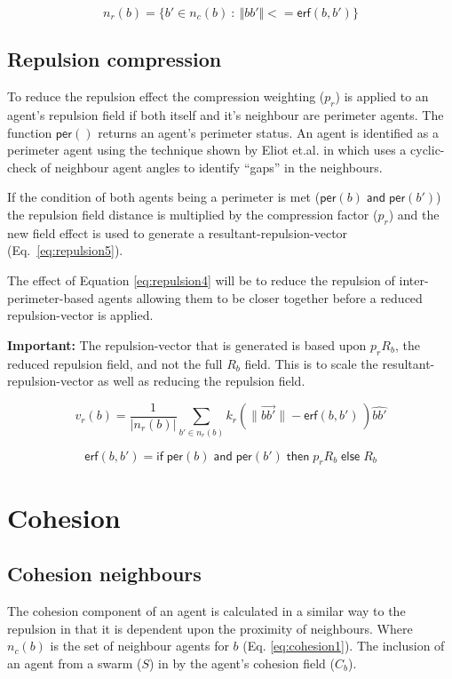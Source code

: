 \documentclass[12pt,a4paper]{article}
\newcommand{\important}[1]{\begin{importantBox} \textbf{Important:} #1 \end{importantBox}}
\newcommand{\magn}[1]{\Vert{#1}\Vert}
\begin{document}
\begin{equation}\label{eq:repulsion3}
n_r(b) = \{b' \in n_c(b)~:~\magn{bb'} <= \mathsf{erf}(b,b')\}
\end{equation}

\subsection{Repulsion compression}\label{repulsion:compression}
To reduce the repulsion effect the compression weighting ($p_r$) is applied to an agent's repulsion field if both itself and it's neighbour are perimeter agents. The function $\mathsf{per}()$ returns an agent's perimeter status. An agent is identified as a perimeter agent using the technique shown by Eliot et.al. in \cite{eliot2019void} which uses a cyclic-check of neighbour agent angles to identify ``gaps'' in the neighbours.

If the condition of both agents being a perimeter is met ($\mathsf{per}(b) \; \mathsf{and} \; \mathsf{per}(b')$) the repulsion field distance is multiplied by the compression factor ($p_r$) and the new field effect is used to generate a resultant-repulsion-vector (Eq.~\ref{eq:repulsion5}). 

The effect of Equation \ref{eq:repulsion4} will be to reduce the repulsion of inter-perimeter-based agents allowing them to be closer together before a reduced repulsion-vector is applied. 

\important{The repulsion-vector that is generated is based upon $p_rR_b$, the reduced repulsion field, and not the full $R_b$ field. This is to scale the resultant-repulsion-vector as well as reducing the repulsion field.}

\begin{equation}\label{eq:repulsion4}
v_r(b) = \frac{1}{\lvert n_r(b)\rvert}\sum_{b' \in n_r(b)} k_r\left(\lVert\vec{b b'}\rVert - \mathsf{erf}(b,b') \, \right)\widehat{bb'}
\end{equation}

\begin{equation}\label{eq:repulsion5}
\mathsf{erf}(b, b') = \mathsf{if} \;
\mathsf{per}(b) \; \mathsf{and} \; \mathsf{per}(b') \; \mathsf{then} \;
p_rR_b \; \mathsf{else} \; R_b
\end{equation}

\section{Cohesion}\label{cohesion}
\subsection{Cohesion neighbours}\label{cohesion:neighbours}
The cohesion component of an agent is calculated in a similar way to the repulsion in that it is dependent upon the proximity of neighbours. Where $n_c(b)$ is the set of neighbour agents for $b$ (Eq. \ref{eq:cohesion1}). The inclusion of an agent from a swarm ($S$) in by the agent's cohesion field ($C_b$).
\end{document}
